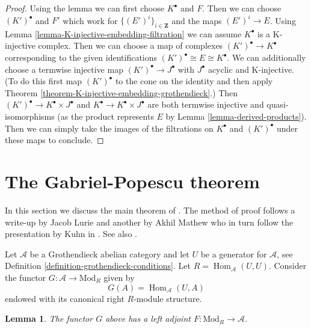 \documentclass{stacks-project}
\theoremstyle{plain}
\newtheorem{lemma}[subsection]{Lemma}
\theoremstyle{definition}
\theoremstyle{remark}
\numberwithin{equation}{subsection}
\def\Hom{\mathop{\mathrm{Hom}}\nolimits}
\begin{document}
\begin{proof}
Using the lemma we can first choose $K^\bullet$ and $F$.
Then we can choose $(K')^\bullet$ and $F'$ which work for
$\{(E')^i\}_{i \in \mathbf{Z}}$ and the maps $(E')^i \to E$.
Using Lemma \ref{lemma-K-injective-embedding-filtration}
we can assume $K^\bullet$ is a K-injective complex.
Then we can choose a map of complexes
$(K')^\bullet \to K^\bullet$ corresponding to
the given identifications
$(K')^\bullet \cong E \cong K^\bullet$.
We can additionally choose a termwise injective
map $(K')^\bullet \to J^\bullet$ with
$J^\bullet$ acyclic and K-injective.
(To do this first map $(K')^\bullet$ to the cone on the identity
and then apply Theorem \ref{theorem-K-injective-embedding-grothendieck}.)
Then $(K')^\bullet \to K^\bullet \times J^\bullet$ and
$K^\bullet \to K^\bullet \times J^\bullet$
are both termwise injective and quasi-isomorphisms
(as the product represents $E$ by Lemma \ref{lemma-derived-products}).
Then we can simply take the images of the filtrations
on $K^\bullet$ and $(K')^\bullet$ under these maps to conclude.
\end{proof}





\section{The Gabriel-Popescu theorem}
\label{section-gabriel-popescu}

\noindent
In this section we discuss the main theorem of \cite{GP}. The method of
proof follows a write-up by Jacob Lurie and another by Akhil Mathew
who in turn follow the presentation by Kuhn in \cite{Kuhn}.
See also \cite{Takeuchi}.

\medskip\noindent
Let $\mathcal{A}$ be a Grothendieck abelian category and let $U$ be a
generator for $\mathcal{A}$, see
Definition \ref{definition-grothendieck-conditions}.
Let $R = \Hom_\mathcal{A}(U, U)$. Consider the functor
$G : \mathcal{A} \to \text{Mod}_R$ given by
$$
G(A) = \Hom_\mathcal{A}(U, A)
$$
endowed with its canonical right $R$-module structure.

\begin{lemma}
\label{lemma-gabriel-popescu-left-adjoint}
The functor $G$ above has a left adjoint
$F : \text{Mod}_R \to \mathcal{A}$.
\end{lemma}
\end{document}
